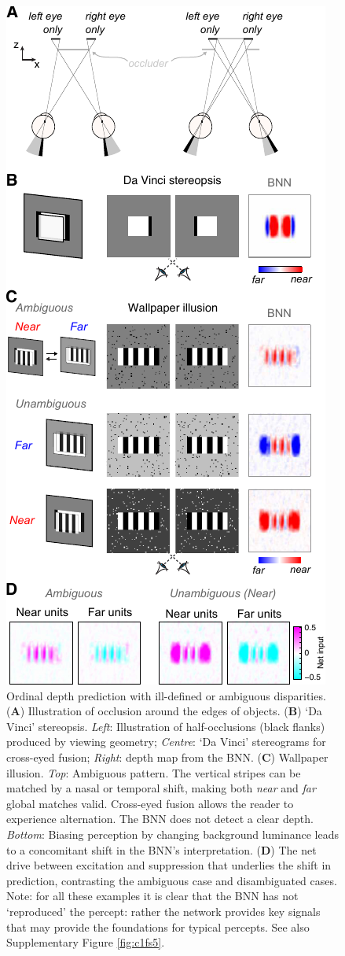 {\begin{figure}[!h]
  \centering
  \includegraphics{chapter1/chapter1-figs/Fig6.pdf}
  \caption[Ordinal depth prediction with ill-defined or ambiguous disparities.]{Ordinal depth prediction with ill-defined or ambiguous disparities. ({\bf A}) Illustration of occlusion around the edges of objects. ({\bf B}) `Da Vinci' stereopsis. {\it Left}: Illustration of half-occlusions (black flanks) produced by viewing geometry; {\it Centre}: `Da Vinci' stereograms for cross-eyed fusion; {\it Right}: depth map from the BNN. ({\bf C}) Wallpaper illusion. {\it Top}: Ambiguous pattern. The vertical stripes can be matched by a nasal or temporal shift, making both {\it near} and {\it far} global matches valid. Cross-eyed fusion allows the reader to experience alternation. The BNN does not detect a clear depth. {\it Bottom}: Biasing perception by changing background luminance leads to a concomitant shift in the BNN's interpretation. ({\bf D}) The net drive between excitation and suppression that underlies the shift in prediction, contrasting the ambiguous case and disambiguated cases. Note: for all these examples it is clear that the BNN has not `reproduced' the percept: rather the network provides key signals that may provide the foundations for typical percepts. See also Supplementary Figure \ref{fig:c1fs5}. }

\end{figure}}
